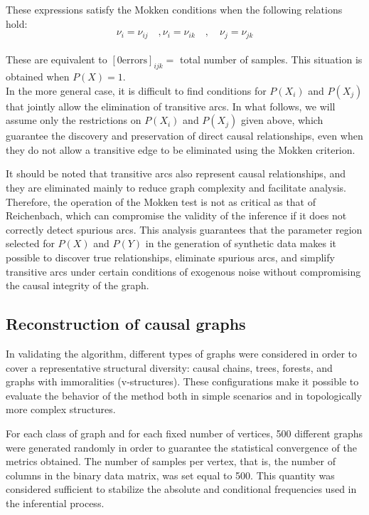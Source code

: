 \documentclass[12pt,a4paper]{report}
\begin{document}
These expressions satisfy the Mokken conditions when the following relations hold:
\begin{equation}
\label{eq:mokken}
\nu_i = \nu_{ij} \quad,  \nu_i =\nu_{ik} \quad, \quad \nu_{j} = \nu_{jk}
\end{equation}
\\
These are equivalent to $[0 \mathrm{errors}]_{ijk} =$ total number of samples. This situation is obtained when $P(X) = 1$.
\\

In the more general case, it is difficult to find conditions for $P(X_i)$ and $P(X_j)$ that jointly allow the elimination of transitive arcs. In what follows, we will assume only the restrictions on $P(X_i)$ and $P(X_j)$ given above, which guarantee the discovery and preservation of direct causal relationships, even when they do not allow a transitive edge to be eliminated using the Mokken criterion.




It should be noted that transitive arcs also represent causal relationships, and they are eliminated mainly to reduce graph complexity and facilitate analysis. Therefore, the operation of the Mokken test is not as critical as that of Reichenbach, which can compromise the validity of the inference if it does not correctly detect spurious arcs. This analysis guarantees that the parameter region selected for \( P(X) \) and \( P(Y) \) in the generation of synthetic data makes it possible to discover true relationships, eliminate spurious arcs, and simplify transitive arcs under certain conditions of exogenous noise without compromising the causal integrity of the graph.





\subsection{Reconstruction of causal graphs}

In validating the algorithm, different types of graphs were considered in order to cover a representative structural diversity: causal chains, trees, forests, and graphs with immoralities (v-structures). These configurations make it possible to evaluate the behavior of the method both in simple scenarios and in topologically more complex structures.

For each class of graph and for each fixed number of vertices, 500 different graphs were generated randomly in order to guarantee the statistical convergence of the metrics obtained. The number of samples per vertex, that is, the number of columns in the binary data matrix, was set equal to 500. This quantity was considered sufficient to stabilize the absolute and conditional frequencies used in the inferential process.
\end{document}
